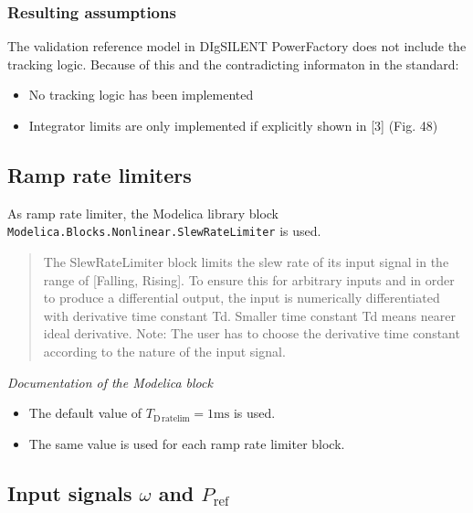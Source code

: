 \documentclass[
  a4paper,
  DIV=11,
  numbers=noendperiod]{scrartcl}
\providecommand{\tightlist}{%
  \setlength{\itemsep}{0pt}\setlength{\parskip}{0pt}}\usepackage{longtable,booktabs,array}
\begin{document}
\subsubsection{Resulting assumptions}\label{resulting-assumptions}

The validation reference model in DIgSILENT PowerFactory does not
include the tracking logic. Because of this and the contradicting
informaton in the standard:

\begin{itemize}
\tightlist
\item
  No tracking logic has been implemented
\item
  Integrator limits are only implemented if explicitly shown in {[}3{]}
  (Fig. 48)
\end{itemize}

\subsection{Ramp rate limiters}\label{ramp-rate-limiters}

As ramp rate limiter, the Modelica library block
\texttt{Modelica.Blocks.Nonlinear.SlewRateLimiter} is used.

\begin{quote}
The SlewRateLimiter block limits the slew rate of its input signal in
the range of {[}Falling, Rising{]}. To ensure this for arbitrary inputs
and in order to produce a differential output, the input is numerically
differentiated with derivative time constant Td. Smaller time constant
Td means nearer ideal derivative. Note: The user has to choose the
derivative time constant according to the nature of the input signal.
\end{quote}

\emph{Documentation of the Modelica block}

\begin{itemize}
\tightlist
\item
  The default value of \(T_\mathrm{D\,ratelim}=1 \mathrm{ms}\) is used.
\item
  The same value is used for each ramp rate limiter block.
\end{itemize}

\subsection{\texorpdfstring{Input signals \(\omega\) and
\(P_\mathrm{ref}\)}{Input signals \textbackslash omega and P\_\textbackslash mathrm\{ref\}}}\label{input-signals-omega-and-p_mathrmref}
\end{document}
